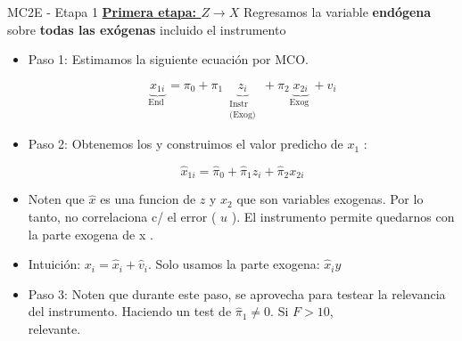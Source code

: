 \documentclass[10pt]{beamer}
\begin{document}
\begin{frame}{MC2E - Etapa 1}
    \underline{\textbf{Primera etapa: $Z \rightarrow X$}} Regresamos la variable \textbf{endógena} sobre \textbf{todas las exógenas} incluido el instrumento

    \begin{itemize}
        \item Paso 1: Estimamos la siguiente ecuación por MCO.

        \begin{equation*}
        \underbrace{x_{1 i}}_{\text {End }}=\pi_{0}+\pi_{1} \underbrace{z_{i}}_{\substack{\text { Instr } \\ \text { (Exog) }}}+\pi_{2} \underbrace{x_{2 i}}_{\text {Exog }}+v_{i} \tag{1}
        \end{equation*}
        
        \item Paso 2: Obtenemos los y construimos el valor predicho de $x_{1}$ :
        
        \begin{equation*}
        \hat{x}_{1 i}=\hat{\pi}_{0}+\hat{\pi}_{1} z_{i}+\hat{\pi}_{2} x_{2 i} \tag{2}
        \end{equation*}
        
        \item Noten que $\hat{x}$ es una funcion de $z$ y $x_{2}$ que son variables exogenas. Por lo tanto, no correlaciona c/ el error ( $u$ ). El instrumento permite quedarnos con la parte exogena de x .
        \item Intuición: $x_{i}=\hat{x}_{i}+\hat{v}_{i}$. Solo usamos la parte exogena: $\hat{x}_{i} y$
        \item Paso 3: Noten que durante este paso, se aprovecha para testear la relevancia del instrumento. Haciendo un test de $\hat{\pi}_{1} \neq 0$. Si $F>10$, \\ relevante.
    \end{itemize}
\end{frame}
\end{document}
